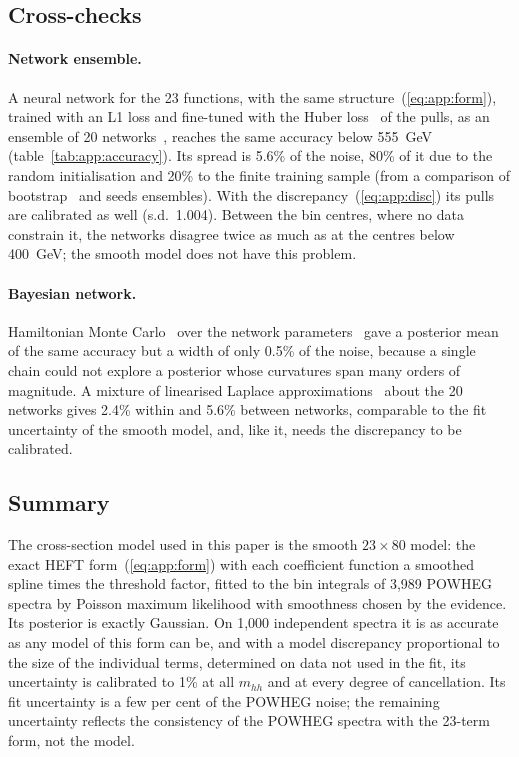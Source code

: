 \subsection{Cross-checks}
\label{app:crosscheck}

\paragraph{Network ensemble.} A neural network for the 23 functions, with the same
structure~(\ref{eq:app:form}), trained with an L1 loss and fine-tuned with the Huber
loss~\cite{Huber:1964} of the pulls, as an ensemble of 20 networks~\cite{Lakshminarayanan:2016}, reaches
the same accuracy below 555~GeV (table~\ref{tab:app:accuracy}). Its spread is 5.6\% of the noise, 80\% of
it due to the random initialisation and 20\% to the finite training sample (from a comparison of
bootstrap~\cite{Efron:1993} and seeds ensembles). With the discrepancy~(\ref{eq:app:disc}) its pulls are
calibrated as well (s.d.\ 1.004). Between the bin centres, where no data constrain it, the networks
disagree twice as much as at the centres below 400~GeV; the smooth model does not have this problem.

\paragraph{Bayesian network.} Hamiltonian Monte Carlo~\cite{Duane:1987,Neal:2011} over the network
parameters~\cite{Neal:1996} gave a posterior mean of the same accuracy but a width of only 0.5\% of the
noise, because a single chain could not explore a posterior whose curvatures span many orders of
magnitude. A mixture of linearised Laplace approximations~\cite{MacKay:1992b,Immer:2021} about the 20
networks gives 2.4\% within and 5.6\% between networks, comparable to the fit uncertainty of the smooth
model, and, like it, needs the discrepancy to be calibrated.

\subsection{Summary}
\label{app:summary}

The cross-section model used in this paper is the smooth $23\times80$ model: the exact HEFT
form~(\ref{eq:app:form}) with each coefficient function a smoothed spline times the threshold factor,
fitted to the bin integrals of 3,989 POWHEG spectra by Poisson maximum likelihood with smoothness chosen
by the evidence. Its posterior is exactly Gaussian. On 1,000 independent spectra it is as accurate as any
model of this form can be, and with a model discrepancy proportional to the size of the individual terms,
determined on data not used in the fit, its uncertainty is calibrated to 1\% at all $m_{hh}$ and at every
degree of cancellation. Its fit uncertainty is a few per cent of the POWHEG noise; the remaining
uncertainty reflects the consistency of the POWHEG spectra with the 23-term form, not the model.
